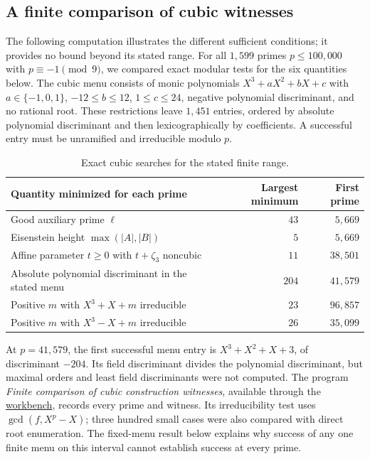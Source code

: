 \documentclass[11pt]{article}
\newcommand{\workbenchurl}{https://github.com/KokunoYumeto/zeta-and-l-functions-workbench}
\theoremstyle{definition}
\theoremstyle{remark}
\begin{document}
\subsection{A finite comparison of cubic witnesses}
The following computation illustrates the different sufficient conditions;
it provides no bound beyond its stated range.
For all $1{,}599$ primes $p\le100{,}000$ with $p\equiv-1\pmod9$,
we compared exact modular tests for the six quantities below.
The cubic menu consists of monic polynomials $X^3+aX^2+bX+c$ with
$a\in\{-1,0,1\}$, $-12\le b\le12$, $1\le c\le24$,
negative polynomial discriminant, and no rational root.
These restrictions leave $1{,}451$ entries, ordered by absolute
polynomial discriminant and then lexicographically by coefficients.
A successful entry must be unramified and irreducible modulo $p$.
\begin{table}[htbp]
\centering
\small
\begin{tabular}{@{}p{}rr@{}}
\toprule
Quantity minimized for each prime & Largest minimum & First prime\\
\midrule
Good auxiliary prime $\ell$ & $43$ & $5{,}669$\\
Eisenstein height $\max(|A|,|B|)$ & $5$ & $5{,}669$\\
Affine parameter $t\ge0$ with $t+\zeta_3$ noncubic & $11$ & $38{,}501$\\
Absolute polynomial discriminant in the stated menu & $204$ & $41{,}579$\\
Positive $m$ with $X^3+X+m$ irreducible & $23$ & $96{,}857$\\
Positive $m$ with $X^3-X+m$ irreducible & $26$ & $35{,}099$\\
\bottomrule
\end{tabular}
\caption{Exact cubic searches for the stated finite range.}
\label{tab:cubic-finite-probe}
\end{table}
At $p=41{,}579$, the first successful menu entry is
$X^3+X^2+X+3$, of discriminant $-204$.
Its field discriminant divides the polynomial discriminant, but
maximal orders and least field discriminants were not computed.
The program \emph{Finite comparison of cubic construction witnesses},
available through the \href{\workbenchurl}{workbench}, records every
prime and witness.  Its irreducibility test uses $\gcd(f,X^p-X)$;
three hundred small cases were also compared with direct root enumeration.
The fixed-menu result below explains why success of any one finite menu
on this interval cannot establish success at every prime.
\end{document}
